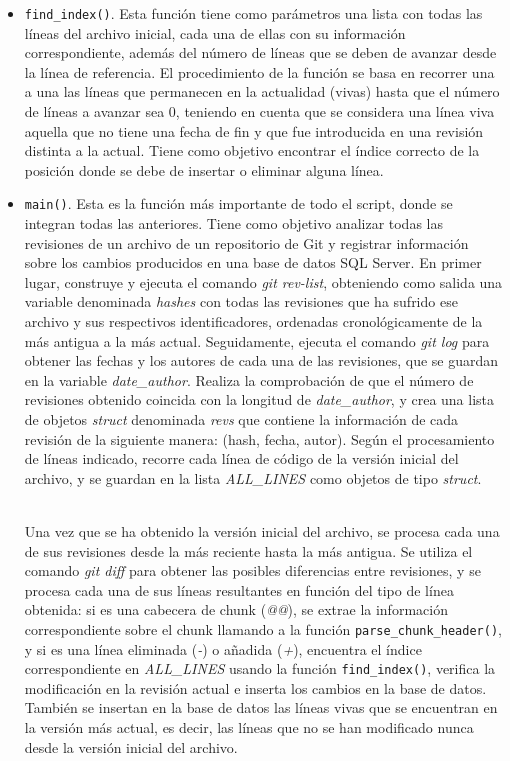 \documentclass[a4paper, 12pt]{book}
\begin{document}
\begin{itemize}
  \item \texttt{find\_index()}. Esta función tiene como parámetros una lista con todas las líneas del archivo inicial, cada una de ellas con su información correspondiente, además del número de líneas que se deben de avanzar desde la línea de referencia. El procedimiento de la función se basa en recorrer una a una las líneas que
  permanecen en la actualidad (vivas) hasta que el número de líneas a avanzar sea 0, teniendo en cuenta que se considera una línea viva aquella que no tiene una fecha de fin y que fue introducida en una revisión distinta a la actual. Tiene como objetivo encontrar el índice correcto de la posición donde se debe de insertar o eliminar
  alguna línea.
    
  \item \texttt{main()}. Esta es la función más importante de todo el script, donde se integran todas las anteriores. Tiene como objetivo analizar todas las revisiones de un archivo de un repositorio de Git y registrar información sobre los cambios producidos en una base de datos SQL Server. En primer lugar, construye y ejecuta
  el comando \textit{git rev-list}, obteniendo como salida una variable denominada \textit{hashes} con todas las revisiones que ha sufrido ese archivo y sus respectivos identificadores, ordenadas cronológicamente de la más antigua a la más actual. Seguidamente, ejecuta el comando \textit{git log} para obtener las fechas y los autores
  de cada una de las revisiones, que se guardan en la variable \textit{date\_author}. Realiza la comprobación de que el número de revisiones obtenido coincida con la longitud de \textit{date\_author}, y crea una lista de objetos \textit{struct} denominada \textit{revs} que contiene la información de cada revisión de la siguiente manera:
  (hash, fecha, autor). Según el procesamiento de líneas indicado, recorre cada línea de código de la versión inicial del archivo, y se guardan en la lista \textit{ALL\_LINES} como objetos de tipo \textit{struct}.
  
  \\Una vez que se ha obtenido la versión inicial del archivo, se procesa cada una de sus revisiones desde la más reciente hasta la más antigua. Se utiliza el comando \textit{git diff} para obtener las posibles diferencias entre revisiones, y se procesa cada una de sus líneas resultantes en función del tipo de línea obtenida: si es una
  cabecera de chunk (\textit{@@}), se extrae la información correspondiente sobre el chunk llamando a la función \texttt{parse\_chunk\_header()}, y si es una línea eliminada (\textit{-}) o añadida (\textit{+}), encuentra el índice correspondiente en \textit{ALL\_LINES} usando la función \texttt{find\_index()}, verifica la modificación
  en la revisión actual e inserta los cambios en la base de datos. También se insertan en la base de datos las líneas vivas que se encuentran en la versión más actual, es decir, las líneas que no se han modificado nunca desde la versión inicial del archivo.
  

\end{itemize}
\end{document}
